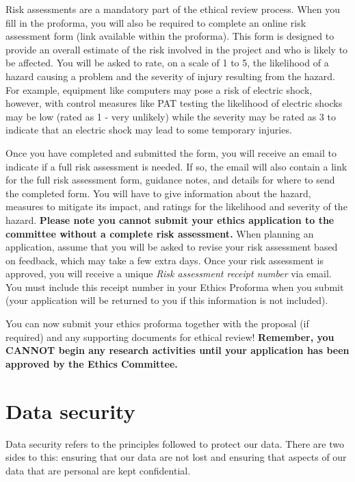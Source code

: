\documentclass[12pt,]{book}
\theoremstyle{definition}
\theoremstyle{definition}
\theoremstyle{definition}
\theoremstyle{remark}
\begin{document}
Risk assessments are a mandatory part of the ethical review process.
When you fill in the proforma, you will also be required to complete an
online risk assessment form (link available within the proforma). This
form is designed to provide an overall estimate of the risk involved in
the project and who is likely to be affected. You will be asked to rate,
on a scale of 1 to 5, the likelihood of a hazard causing a problem and
the severity of injury resulting from the hazard. For example, equipment
like computers may pose a risk of electric shock, however, with control
measures like PAT testing the likelihood of electric shocks may be low
(rated as 1 - very unlikely) while the severity may be rated as 3 to
indicate that an electric shock may lead to some temporary injuries.

Once you have completed and submitted the form, you will receive an
email to indicate if a full risk assessment is needed. If so, the email
will also contain a link for the full risk assessment form, guidance
notes, and details for where to send the completed form. You will have
to give information about the hazard, measures to mitigate its impact,
and ratings for the likelihood and severity of the hazard.
\textbf{Please note you cannot submit your ethics application to the
committee without a complete risk assessment.} When planning an
application, assume that you will be asked to revise your risk
assessment based on feedback, which may take a few extra days. Once your
risk assessment is approved, you will receive a unique \emph{Risk
assessment receipt number} via email. You must include this receipt
number in your Ethics Proforma when you submit (your application will be
returned to you if this information is not included).

You can now submit your ethics proforma together with the proposal (if
required) and any supporting documents for ethical review!
\textbf{Remember, you CANNOT begin any research activities until your
application has been approved by the Ethics Committee.}

\chapter{Data security}\label{data-security}

Data security refers to the principles followed to protect our data.
There are two sides to this: ensuring that our data are not lost and
ensuring that aspects of our data that are personal are kept
confidential.
\end{document}
